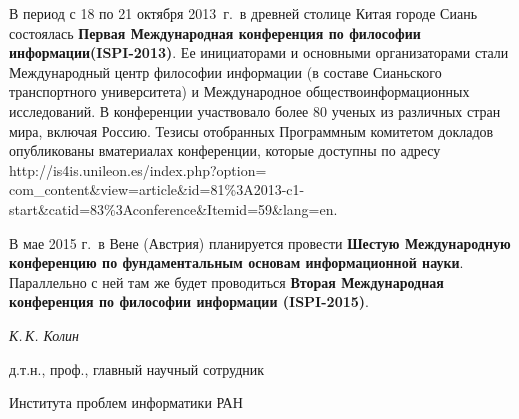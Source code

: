 \begin{multicols}{2}
   В период с 18 по 21 октября 2013~г.\ в древней столице Китая городе Сиань состоялась 
\textbf{Первая Международная конференция по философии информации\linebreak (ISPI-2013)}. Ее 
\mbox{инициаторами} и основными организаторами стали Международный центр философии 
информации (в составе Сианьского транспортного университета) и Международное 
общество\linebreak ин\-фор\-ма\-ци\-он\-ных исследований. В конференции участвовало более 80 
ученых из различных стран мира, включая Россию. Тезисы отобранных Программным 
комитетом докладов опубликованы в\linebreak материалах конференции, которые доступны по 
адресу {\sf http://is4is.unileon.es/index.php?option=\linebreak 
com\_content\&view=article\&id=81\%3A2013-c1-start\&\linebreak catid=83\%3Aconference\&Itemid=59\&lang=en}.
   
     В мае 2015 г.\ в Вене (Австрия) планируется провести \textbf{Шестую Международную 
конференцию по фундаментальным основам информационной науки}. Параллельно с ней 
там же будет проводиться \textbf{Вторая Международная конференция по философии 
информации (ISPI-2015)}.

\end{multicols}

\hspace*{10mm}

\hfill \textit{К.\,К. Колин}

\hfill д.т.н., проф., главный научный сотрудник 

\hfill Института проблем информатики РАН
